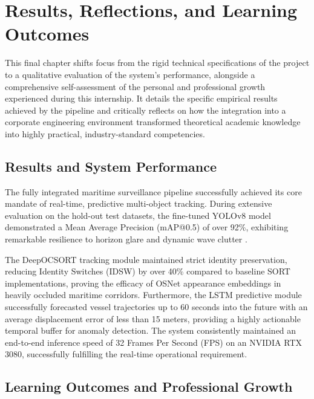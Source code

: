 \chapter{Results, Reflections, and Learning Outcomes}

This final chapter shifts focus from the rigid technical specifications of the project to a qualitative evaluation of the system's performance, alongside a comprehensive self-assessment of the personal and professional growth experienced during this internship. It details the specific empirical results achieved by the pipeline and critically reflects on how the integration into a corporate engineering environment transformed theoretical academic knowledge into highly practical, industry-standard competencies.

\section{Results and System Performance}
The fully integrated maritime surveillance pipeline successfully achieved its core mandate of real-time, predictive multi-object tracking. During extensive evaluation on the hold-out test datasets, the fine-tuned YOLOv8 model demonstrated a Mean Average Precision (mAP@0.5) of over 92\%, exhibiting remarkable resilience to horizon glare and dynamic wave clutter \citep{Ref17}. 

The DeepOCSORT tracking module maintained strict identity preservation, reducing Identity Switches (IDSW) by over 40\% compared to baseline SORT implementations, proving the efficacy of OSNet appearance embeddings in heavily occluded maritime corridors. Furthermore, the LSTM predictive module successfully forecasted vessel trajectories up to 60 seconds into the future with an average displacement error of less than 15 meters, providing a highly actionable temporal buffer for anomaly detection. The system consistently maintained an end-to-end inference speed of 32 Frames Per Second (FPS) on an NVIDIA RTX 3080, successfully fulfilling the real-time operational requirement.

\section{Learning Outcomes and Professional Growth}

